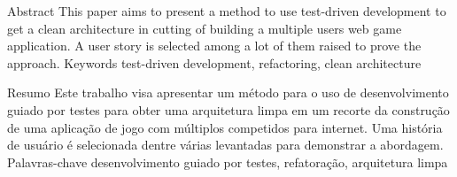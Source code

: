 \resumo
  {Abstract}
  {This paper aims to present a method to use test-driven development to get a clean architecture in cutting of building a multiple users web game application. A user story is selected among a lot of them raised to prove the approach.}
  {Keywords}
  {test-driven development, refactoring, clean architecture}

\resumo
  {Resumo}
  {Este trabalho visa apresentar um método para o uso de desenvolvimento guiado por testes para obter uma arquitetura limpa em um recorte da construção de uma aplicação de jogo com múltiplos competidos para internet. Uma história de usuário é selecionada dentre várias levantadas para demonstrar a abordagem.}
  {Palavras-chave}
  {desenvolvimento guiado por testes, refatoração, arquitetura limpa}
